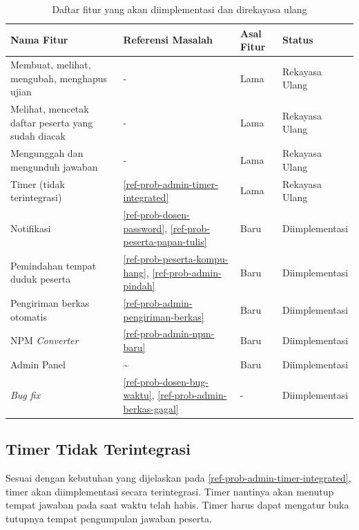     \begin{table}[H]
        \centering
        \begin{tabular}{|p{4.5cm}|l|l|l|}
        \hline
        Nama Fitur & Referensi Masalah & Asal Fitur & Status\\
        \hline
        Membuat, melihat, mengubah, menghapus ujian & - & Lama & Rekayasa Ulang \\
        \hline
        Melihat, mencetak daftar peserta yang sudah diacak & - & Lama & Rekayasa Ulang \\
        \hline
        Mengunggah dan mengunduh jawaban & - & Lama & Rekayasa Ulang \\
        \hline
        Timer (tidak terintegrasi)  & \ref{ref-prob-admin-timer-integrated} & Lama & Rekayasa Ulang \\
        \hline
        Notifikasi & \ref{ref-prob-dosen-password}, \ref{ref-prob-peserta-papan-tulis} & Baru & Diimplementasi \\
        \hline
        Pemindahan tempat duduk peserta & \ref{ref-prob-peserta-kompu-hang}, \ref{ref-prob-admin-pindah} & Baru & Diimplementasi \\
        \hline
        Pengiriman berkas otomatis & \ref{ref-prob-admin-pengiriman-berkas} & Baru & Diimplementasi \\
        \hline
        NPM \textit{Converter} & \ref{ref-prob-admin-npm-baru} & Baru & Diimplementasi \\
        \hline
        Admin Panel & \~{} & Baru & Diimplementasi \\
        \hline
        \textit{Bug fix} & \ref{ref-prob-dosen-bug-waktu}, \ref{ref-prob-admin-berkas-gagal}  & - & Diimplementasi \\
        \hline
        \end{tabular}
        \caption{Daftar fitur yang akan diimplementasi dan direkayasa ulang}
        \label{tab:table-daftar-fitur}
    \end{table}
    
    \subsection{Timer Tidak Terintegrasi}
        Sesuai dengan kebutuhan yang dijelaskan pada
        \ref{ref-prob-admin-timer-integrated}, timer akan diimplementasi secara
        terintegrasi. Timer nantinya akan menutup tempat jawaban pada saat waktu
        telah habis. Timer harus dapat mengatur buka tutupnya tempat pengumpulan
        jawaban peserta.
    
